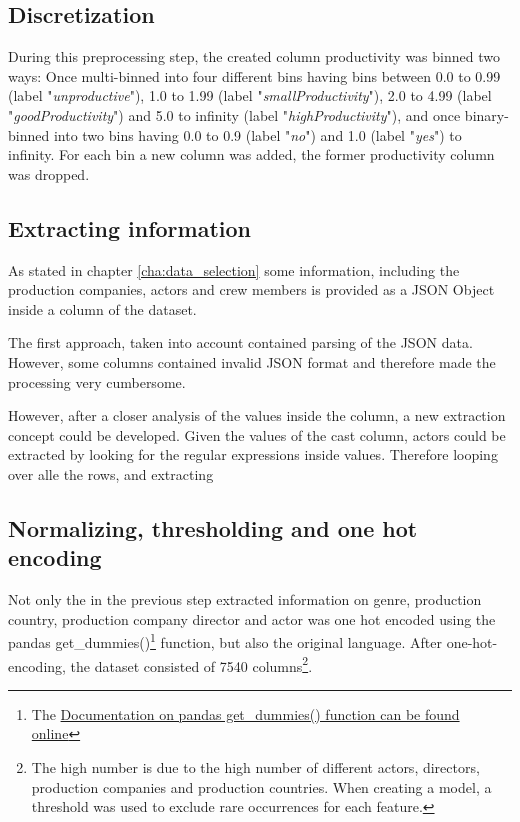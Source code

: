 \subsection{Discretization}
During this preprocessing step, the created column productivity was binned two ways: Once multi-binned into four different bins having bins between 0.0 to 0.99 (label "\textit{unproductive}"), 1.0 to 1.99 (label "\textit{smallProductivity}"), 2.0 to 4.99 (label "\textit{goodProductivity}") and 5.0 to infinity (label "\textit{highProductivity}"), and once binary-binned into two bins having 0.0 to 0.9 (label "\textit{no}") and 1.0 (label "\textit{yes}") to infinity. For each bin a new column was added, the former productivity column was dropped.

\subsection{Extracting information}
As stated in chapter \ref{cha:data_selection} some information, including the production companies, actors and crew members is provided as a JSON Object inside a column of the dataset. 

The first approach, taken into account contained parsing of the JSON data. However, some columns contained invalid JSON format and therefore made the processing very cumbersome.

However, after a closer analysis of the values inside the column, a new extraction concept could be developed. Given the values of the cast column, actors could be extracted by looking for the regular expressions inside values. Therefore looping over alle the rows, and extracting 

\subsection{Normalizing, thresholding and one hot encoding}
Not only the in the previous step extracted information on genre, production country, production company director and actor was one hot encoded using the pandas get\_dummies()\footnote{The \hyperref{https://pandas.pydata.org/pandas-docs/stable/generated/pandas.get_dummies.html}{documentation}{pd.getDumies}{Documentation on pandas get\_dummies() function can be found online}} function, but also the original language. After one-hot-encoding, the dataset consisted of 7540 columns\footnote{The high number is due to the high number of different actors, directors, production companies and production countries. When creating a model, a threshold was used to exclude rare occurrences for each feature.}.

